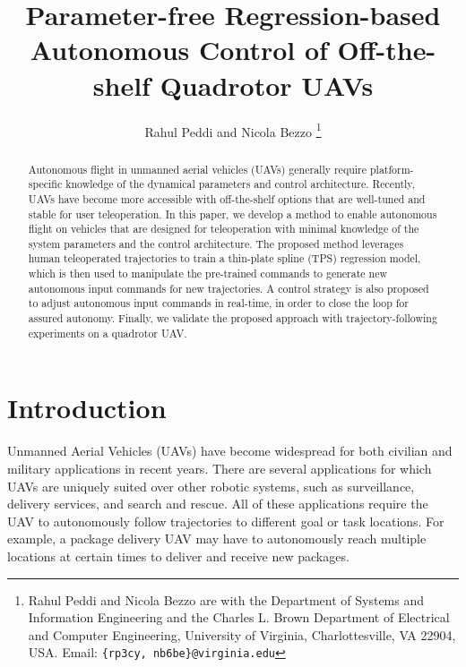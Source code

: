 \documentclass[letterpaper, 10 pt, conference]{ieeeconf}  %
\newcommand\NB[1]{$\spadesuit$\footnote{NB: #1}}
\begin{document}
\title{\LARGE \bf
Parameter-free Regression-based Autonomous Control of Off-the-shelf Quadrotor UAVs
}


\author{Rahul Peddi and Nicola Bezzo%
\thanks{Rahul Peddi and Nicola Bezzo are with the Department of Systems and Information Engineering and the Charles L. Brown Department of Electrical and Computer Engineering, University of Virginia, Charlottesville, VA 22904, USA. Email: {\tt \{rp3cy, nb6be\}@virginia.edu}}}



\maketitle
\thispagestyle{empty}
\pagestyle{empty}


\begin{abstract}
Autonomous flight in unmanned aerial vehicles (UAVs) generally require platform-specific knowledge of the dynamical parameters and control architecture. Recently, UAVs have become more accessible with off-the-shelf options that are well-tuned and stable for user teleoperation. In this paper, we develop a method to enable autonomous flight on vehicles that are designed for teleoperation with minimal knowledge of the system parameters and the control architecture. The proposed method leverages human teleoperated trajectories to train a thin-plate spline (TPS) regression model, which is then used to manipulate the pre-trained commands to generate new autonomous input commands for new trajectories. A control strategy is also proposed to adjust autonomous input commands in real-time, in order to close the loop for assured autonomy. Finally, we validate the proposed approach with trajectory-following experiments on a quadrotor UAV.

\end{abstract}


\section{Introduction}
Unmanned Aerial Vehicles (UAVs) have become widespread for both civilian and military applications in recent years. There are several applications for which UAVs are uniquely suited over other robotic systems, such as surveillance, delivery services, and search and rescue. All of these applications require the UAV to autonomously follow trajectories to different goal or task locations. For example, a package delivery UAV may have to autonomously reach multiple locations at certain times to deliver and receive new packages. 
\end{document}
